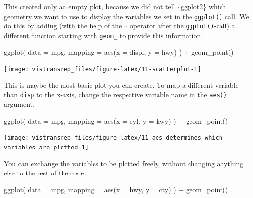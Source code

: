 \documentclass[]{book}
\newenvironment{Shaded}{}{}
\newcommand{\DataTypeTok}[1]{#1}
\newcommand{\KeywordTok}[1]{\textcolor[rgb]{0.00,0.00,1.00}{#1}}
\newcommand{\NormalTok}[1]{#1}
\newcommand{\OperatorTok}[1]{#1}
\newcommand{\StringTok}[1]{\textcolor[rgb]{0.00,0.50,0.50}{#1}}
\begin{document}
This created only an empty plot, because we did not tell \{ggplot2\} which geometry we want to use to display the variables we set in the \texttt{ggplot()} call.
We do this by adding (with the help of the \texttt{+} operator after the \texttt{ggplot()}-call) a different function starting with \texttt{geom\_} to provide this information.

\begin{Shaded}
\begin{Highlighting}[]
\KeywordTok{ggplot}\NormalTok{(}
  \DataTypeTok{data =}\NormalTok{ mpg,}
  \DataTypeTok{mapping =} \KeywordTok{aes}\NormalTok{(}\DataTypeTok{x =}\NormalTok{ displ, }\DataTypeTok{y =}\NormalTok{ hwy)}
\NormalTok{) }\OperatorTok{+}
\StringTok{  }\KeywordTok{geom_point}\NormalTok{()}
\end{Highlighting}
\end{Shaded}

\begin{flushright}\texttt{[image: vistransrep\_files/figure-latex/11-scatterplot-1]} \end{flushright}

This is maybe the most basic plot you can create.
To map a different variable than \texttt{disp} to the x-axis, change the respective variable name in the \texttt{aes()} argument.

\begin{Shaded}
\begin{Highlighting}[]
\KeywordTok{ggplot}\NormalTok{(}
  \DataTypeTok{data =}\NormalTok{ mpg,}
  \DataTypeTok{mapping =} \KeywordTok{aes}\NormalTok{(}\DataTypeTok{x =}\NormalTok{ cyl, }\DataTypeTok{y =}\NormalTok{ hwy)}
\NormalTok{) }\OperatorTok{+}
\StringTok{  }\KeywordTok{geom_point}\NormalTok{()}
\end{Highlighting}
\end{Shaded}

\begin{flushright}\texttt{[image: vistransrep\_files/figure-latex/11-aes-determines-which-variables-are-plotted-1]} \end{flushright}

You can exchange the variables to be plotted freely, without changing anything else to the rest of the code.

\begin{Shaded}
\begin{Highlighting}[]
\KeywordTok{ggplot}\NormalTok{(}
  \DataTypeTok{data =}\NormalTok{ mpg,}
  \DataTypeTok{mapping =} \KeywordTok{aes}\NormalTok{(}\DataTypeTok{x =}\NormalTok{ hwy, }\DataTypeTok{y =}\NormalTok{ cty)}
\NormalTok{) }\OperatorTok{+}
\StringTok{  }\KeywordTok{geom_point}\NormalTok{()}
\end{Highlighting}
\end{Shaded}
\end{document}

